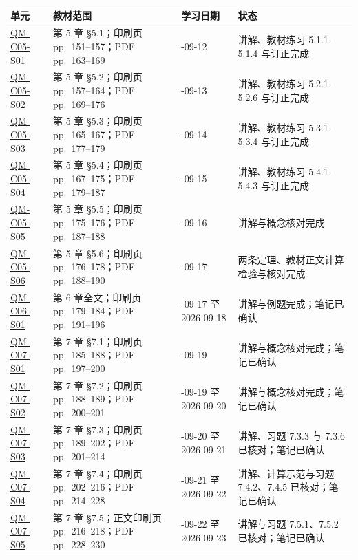 \begin{center}
\footnotesize
\renewcommand{\arraystretch}{1.0}
\begin{tabularx}{\textwidth}{@{}>{\raggedright\arraybackslash}p{2.7cm}>{\raggedright\arraybackslash}p{4.1cm}>{\raggedright\arraybackslash}p{3.0cm}X@{}}
  \toprule
  单元 & 教材范围 & 学习日期 & 状态 \\
  \midrule
  \hyperref[section:QM-C05-S01]{QM-C05-S01} & 第 5 章 \S 5.1；印刷页 pp.~151--157；PDF pp.~163--169 & 2026-09-12 & 讲解、教材练习 5.1.1--5.1.4 与订正完成 \\
  \hyperref[section:QM-C05-S02]{QM-C05-S02} & 第 5 章 \S 5.2；印刷页 pp.~157--164；PDF pp.~169--176 & 2026-09-13 & 讲解、教材练习 5.2.1--5.2.6 与订正完成 \\
  \hyperref[section:QM-C05-S03]{QM-C05-S03} & 第 5 章 \S 5.3；印刷页 pp.~165--167；PDF pp.~177--179 & 2026-09-14 & 讲解、教材练习 5.3.1--5.3.4 与订正完成 \\
  \hyperref[section:QM-C05-S04]{QM-C05-S04} & 第 5 章 \S 5.4；印刷页 pp.~167--175；PDF pp.~179--187 & 2026-09-15 & 讲解、教材练习 5.4.1--5.4.3 与订正完成 \\
  \hyperref[section:QM-C05-S05]{QM-C05-S05} & 第 5 章 \S 5.5；印刷页 pp.~175--176；PDF pp.~187--188 & 2026-09-16 & 讲解与概念核对完成 \\
  \hyperref[section:QM-C05-S06]{QM-C05-S06} & 第 5 章 \S 5.6；印刷页 pp.~176--178；PDF pp.~188--190 & 2026-09-17 & 两条定理、教材正文计算检验与核对完成 \\
  \hyperref[section:QM-C06-S01]{QM-C06-S01} & 第 6 章全文；印刷页 pp.~179--184；PDF pp.~191--196 & 2026-09-17 至 2026-09-18 & 讲解与例题完成；笔记已确认 \\
  \hyperref[section:QM-C07-S01]{QM-C07-S01} & 第 7 章 \S 7.1；印刷页 pp.~185--188；PDF pp.~197--200 & 2026-09-19 & 讲解与概念核对完成；笔记已确认 \\
  \hyperref[section:QM-C07-S02]{QM-C07-S02} & 第 7 章 \S 7.2；印刷页 pp.~188--189；PDF pp.~200--201 & 2026-09-19 至 2026-09-20 & 讲解与概念核对完成；笔记已确认 \\
  \hyperref[section:QM-C07-S03]{QM-C07-S03} & 第 7 章 \S 7.3；印刷页 pp.~189--202；PDF pp.~201--214 & 2026-09-20 至 2026-09-21 & 讲解、习题 7.3.3 与 7.3.6 已核对；笔记已确认 \\
  \hyperref[section:QM-C07-S04]{QM-C07-S04} & 第 7 章 \S 7.4；印刷页 pp.~202--216；PDF pp.~214--228 & 2026-09-21 至 2026-09-22 & 讲解、计算示范与习题 7.4.2、7.4.5 已核对；笔记已确认 \\
  \hyperref[section:QM-C07-S05]{QM-C07-S05} & 第 7 章 \S 7.5；正文印刷页 pp.~216--218；PDF pp.~228--230 & 2026-09-22 至 2026-09-23 & 讲解与习题 7.5.1、7.5.2 已核对；笔记已确认 \\
  \bottomrule
\end{tabularx}
\end{center}

